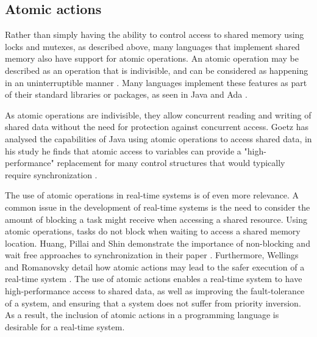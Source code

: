 \subsection{Atomic actions} %
Rather than simply having the ability
to control access to shared memory using locks and mutexes, as described above,
many languages that implement shared memory also have support for atomic
operations. An atomic operation may be described as an operation that is
indivisible, and can be considered as happening in an uninterruptible manner
\cite{preshing}. Many languages implement these features as part of their
standard libraries or packages, as seen in Java  and Ada \cite{java-atomic,
ada-atomic}.  
\par\bigskip\noindent
As atomic operations are indivisible, they
allow concurrent reading and writing of shared data without the need for
protection against concurrent access. Goetz has analysed the capabilities of
Java using atomic operations to access shared  data, in his study he finds that
atomic access to variables can provide a "high-performance" replacement for
many control structures that would typically require synchronization
\cite{java-ibm-atomic}.  
\par\bigskip\noindent
The use of atomic operations in
real-time systems is of even more relevance.  A common issue in the development
of real-time systems is the need to consider the amount of blocking a task
might receive when accessing a shared resource. Using atomic operations, tasks 
do not block when waiting to access a shared memory location. Huang, Pillai and 
Shin demonstrate the importance of non-blocking and wait free approaches to 
synchronization in their paper \cite{Huang:2002:IWA:647057.713863}.
Furthermore, Wellings and Romanovsky detail how atomic actions may lead to the safer
execution of a real-time system \cite{Romanovsky1997}.
The use of atomic actions enables a real-time system to have high-performance
access to shared data, as well as improving the fault-tolerance of a system,
and ensuring that a system does not suffer from priority inversion. 
As a result, the inclusion of atomic actions in a programming language is 
desirable for a real-time system. 

